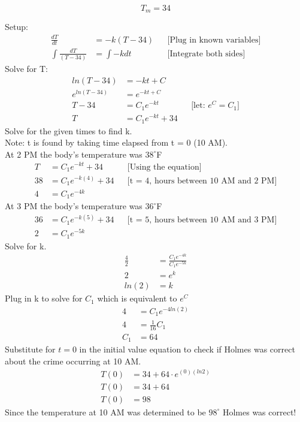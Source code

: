\documentclass{article}
\begin{document}
\begin{flushleft}
{\[ T_m = 34 \]

Setup:
\begin{align*}
\frac{dT}{dt} & = -k(T-34) && \text{[Plug in known variables]}\\
\int \frac{dT}{(T-34)} & = \int -kdt && \text{[Integrate both sides]}
\end{align*}
\bigskip
Solve for T:\\
\begin{align*}
ln(T - 34) & =  -kt + C \\
e^{ln(T - 34)} & = e^{-kt + C} \\
T - 34 & = C_1e^{-kt} && \text{[let: $e^C = C_1$]}\\
T & = C_1e^{-kt} +34
\end{align*}
Solve for the given times to find k. \\
Note: t is found by taking time elapsed from t = 0 (10 AM).\\
At 2 PM the body's temperature was $38^{\circ}$F\\
\begin{align*}
T & = C_1e^{-kt} + 34 && \text{[Using the equation]} \\
38 & = C_1e^{-k(4)} + 34 && \text{[t = 4, hours between 10 AM and  2 PM]} \\
4 & = C_1e^{-4k}
\end{align*}
At 3 PM the body's temperature was $36^{\circ}$F\\
\begin{align*}
36 & = C_1e^{-k(5)} + 34 && \text{[t = 5, hours between 10 AM and  3 PM]} \\
2 & = C_1e^{-5k}
\end{align*}
\newpage
Solve for k.\\
\begin{align*}
\frac{4}{2} & = \frac{C_1e^{-4k}}{C_1e^{-5k}}\\
2 & = e^k\\
ln(2) & = k
\end{align*}
Plug in k to solve for $C_1$ which is equivalent to $e^C$
\begin{align*}
4 & = C_1e^{-4ln(2)} \\
4 & = \frac{1}{16}C_1 \\
C_1 & = 64 
\end{align*}
Substitute for $t = 0$ in the initial value equation to check if Holmes was correct about the crime occurring at 10 AM.
\begin{align*}
T(0) & = 34 + 64 \cdot e^{(0)(ln2)}\\
T(0) & = 34 + 64\\
T(0) & = 98 
\end{align*}
\bigskip
Since the temperature at 10 AM was determined to be $98^{\circ}$ Holmes was correct!\\

}
\end{flushleft}
\end{document}
